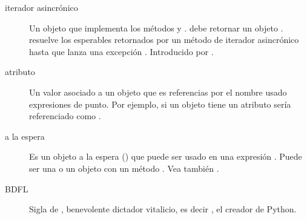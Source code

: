 \documentclass[a4,10pt,spanish]{sphinxmanual}
\begin{document}
\begin{description}
\item[{iterador asincrónico\label{\detokenize{glossary:term-asynchronous-iterator}}}] \leavevmode
\sphinxAtStartPar
Un objeto que implementa los métodos  y .  debe retornar un objeto {\hyperref[\detokenize{glossary:term-awaitable}]{}}.  resuelve los esperables retornados por un método de iterador asincrónico  hasta que lanza una excepción . Introducido por .

\item[{atributo\label{\detokenize{glossary:term-attribute}}}] \leavevmode
\sphinxAtStartPar
Un valor asociado a un objeto que es referencias por el nombre usado expresiones de punto. Por ejemplo, si un objeto  tiene un atributo  sería referenciado como .

\item[{a la espera\label{\detokenize{glossary:term-awaitable}}}] \leavevmode
\sphinxAtStartPar
Es un objeto a la espera () que puede ser usado en una expresión . Puede ser una {\hyperref[\detokenize{glossary:term-coroutine}]{}} o un objeto con un método . Vea también .

\item[{BDFL\label{\detokenize{glossary:term-BDFL}}}] \leavevmode
\sphinxAtStartPar
Sigla de , benevolente dictador vitalicio, es decir , el creador de Python.


\end{description}
\end{document}
